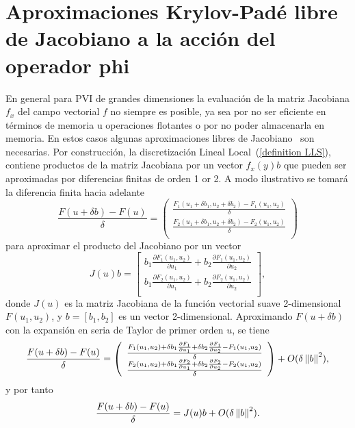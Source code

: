 \section{Aproximaciones Krylov-Padé libre de Jacobiano a la acción del operador phi} \label{section:fj-krylov-pade-approx}
En general para PVI de grandes dimensiones la evaluación de la matriz Jacobiana $f_x$ del campo vectorial $f$ no siempre es posible, ya sea por no ser eficiente en términos de memoria u operaciones flotantes o por no poder almacenarla en memoria. En estos casos algunas aproximaciones libres de Jacobiano~\cite{al2009complex,knoll2004jacobian} son necesarias. Por construcción, la discretización Lineal Local~(\ref{definition LLS}), contiene productos de la matriz Jacobiana por un vector $f_x(y)b$ que pueden ser aproximadas por diferencias finitas de orden 1 or 2. A modo ilustrativo se tomará la diferencia finita hacia adelante
\begin{equation*}
	\frac{F(u+\delta b)-F(u)}{\delta} =  \left(\begin{array}{c}
		\frac{F_1(u_1+\delta b_1,u_2+\delta b_2)-F_1(u_1,u_2)}{\delta}\\
		\frac{F_2(u_1+\delta b_1,u_2+\delta b_2)-F_2(u_1,u_2)}{\delta}\\
	\end{array}\right)
\end{equation*}
para aproximar el producto del Jacobiano por un vector \begin{equation*}
	J(u)b = \left[\begin{array}{c}
		b_1\frac{\partial F_1(u_1,u_2)}{\partial u_1} + b_2\frac{\partial F_1(u_1,u_2)}{\partial u_2}\\
		b_1\frac{\partial F_2(u_1,u_2)}{\partial u_1} + b_2\frac{\partial F_2(u_1,u_2)}{\partial u_2}\\
	\end{array}\right],
\end{equation*}
donde $J(u)$ es la matriz Jacobiana de la función vectorial suave 2-dimensional $F(u_1,u_2)$, y $b=[b_1,b_2]$ es un vector 2-dimensional. Aproximando $F(u+\delta b)$ con la expansión en seria de Taylor de primer orden $u$, se tiene
\begin{equation*}
	\frac{F(u+\delta b)-F(u)}{\delta} =  \left(\begin{array}{c}
		\frac{F_1(u_1,u_2) + \delta b_1 \frac{\partial F_1}{\partial u_1} + \delta b_2 \frac{\partial F_1}{\partial u_2} -F_1(u_1,u_2)}{\delta}\\
		\frac{F_2(u_1,u_2) + \delta b_1 \frac{\partial F_2}{\partial u_1} + \delta b_2 \frac{\partial F_2}{\partial u_2} -F_2(u_1,u_2)}{\delta}\\
	\end{array}\right)  + O(\delta\left\lVert b \right\rVert^2),
\end{equation*}
y por tanto
\begin{equation*}
	\frac{F(u+\delta b)-F(u)}{\delta} =  J(u)b + O(\delta\left\lVert b \right\rVert^2).
\end{equation*}

